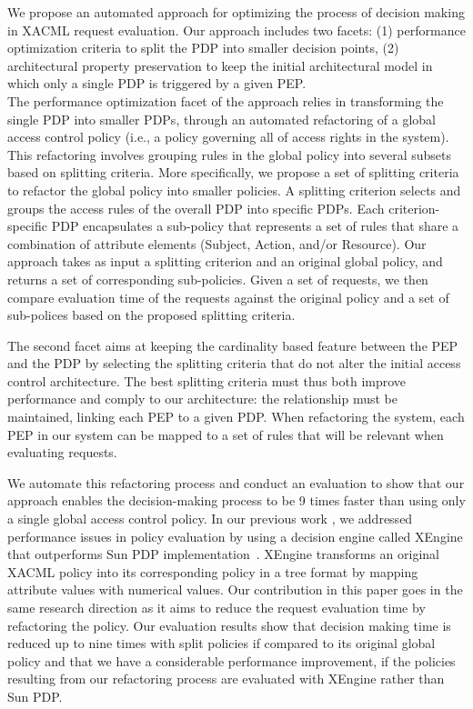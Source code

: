 We propose an automated approach for optimizing the process of decision making in XACML request evaluation. 
Our approach includes two facets: (1) performance optimization criteria to split the PDP into smaller decision points,
(2) architectural property preservation to keep the initial architectural model in which only a single PDP is triggered by a given PEP. \\
The performance optimization facet of the approach relies in transforming the single PDP into smaller PDPs,
through an automated refactoring of a global access control policy (i.e., a policy governing all of access rights in the system).
This refactoring involves grouping rules in the global policy into several subsets based on splitting criteria. More specifically, we propose a set of splitting criteria to
 refactor the global policy into smaller policies.
A splitting criterion selects and groups the access rules of the overall PDP into specific PDPs.
Each criterion-specific PDP encapsulates a sub-policy that represents a set of rules that share a combination
of attribute elements (Subject, Action, and/or Resource). Our approach takes as input a splitting criterion and an original global policy, and returns a set of 
corresponding sub-policies. Given a set of requests, we then compare evaluation time of the requests against the original policy and a set of sub-polices 
based on the proposed splitting criteria.

The second facet aims at keeping the cardinality based feature between the PEP and the PDP by selecting the splitting criteria that
do not alter the initial access control architecture. The best splitting criteria must thus both improve performance and comply to our architecture: the relationship must be 
maintained,
linking each PEP to a given PDP. When refactoring the system, each PEP in our system can be mapped to a set of rules that will be relevant when evaluating
requests. 

We automate this refactoring process and conduct an evaluation to show that our approach enables the decision-making process to be 9 times faster than
using only a single global access control policy. In our previous work \cite{Xengine}, we addressed performance issues in policy evaluation by using
a decision engine called XEngine that outperforms Sun PDP implementation~\cite{oasis}. XEngine transforms an original XACML policy
into its corresponding policy in a tree format by mapping attribute values with numerical values.
Our contribution in this paper goes in the same research direction as it aims to reduce the request evaluation time by refactoring the policy.
Our evaluation results show that decision making time is reduced up to nine times with split policies if compared to its original global policy 
and that we have a considerable performance improvement, if the policies resulting from our refactoring process are evaluated
with XEngine rather than Sun PDP.

